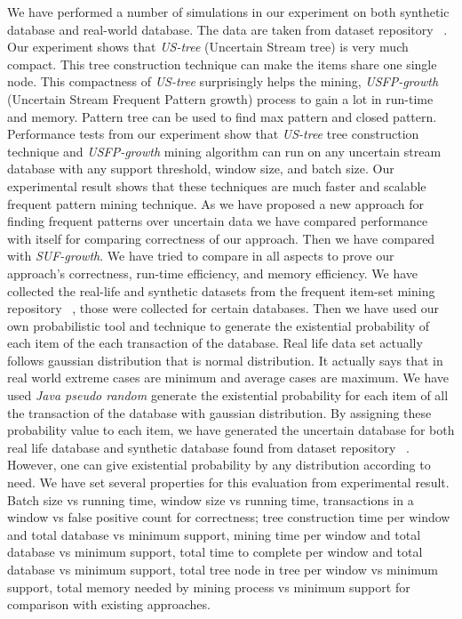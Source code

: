 \documentclass[conference]{IEEEtran}
\begin{document}
We have performed a number of simulations in our experiment on both synthetic database and real-world database. The data are taken from dataset repository ~\cite{dataset}. Our experiment shows that \emph{US-tree} (Uncertain Stream tree) is very much compact. This tree construction technique can make the items share one single node. This compactness of \emph{US-tree} surprisingly helps the mining, \emph{USFP-growth} (Uncertain Stream Frequent Pattern growth) process to gain a lot in run-time and memory. Pattern tree can be used to find max pattern and closed pattern. Performance tests from our experiment show that \emph{US-tree} tree construction technique and \emph{USFP-growth} mining algorithm can run on any uncertain stream database with any support threshold, window size, and batch size. Our experimental result shows that these techniques are much faster and scalable frequent pattern mining technique. As we have proposed a new approach for finding frequent patterns over uncertain data we have compared performance with itself for comparing correctness of our approach. Then we have compared with \emph{SUF-growth}. We have tried to compare in all aspects to prove our approach's correctness, run-time efficiency, and memory efficiency. We have collected the real-life and synthetic datasets from the frequent item-set mining repository ~\cite{dataset}, those were collected for certain databases. Then we have used our own probabilistic tool and technique to generate the existential probability of each item of the each transaction of the database. Real life data set actually follows gaussian distribution that is normal distribution. It actually says that in real world extreme cases are minimum and average cases are maximum. We have used \emph{Java pseudo random} generate the existential probability for each item of all the transaction of the database with gaussian distribution. By assigning these probability value to each item, we have generated the uncertain database for both real life database and synthetic database found from dataset repository ~\cite{dataset}. However, one can give existential probability by any distribution according to need. We have set several properties for this evaluation from experimental result. Batch size vs running time, window size vs running time, transactions in a window vs false positive count for correctness; tree construction time per window and total database vs minimum support, mining time per window and total database vs minimum support, total time to complete per window and total database vs minimum support, total tree node in tree per window vs minimum support, total memory needed by mining process vs minimum support for comparison with existing approaches.\\
\end{document}
